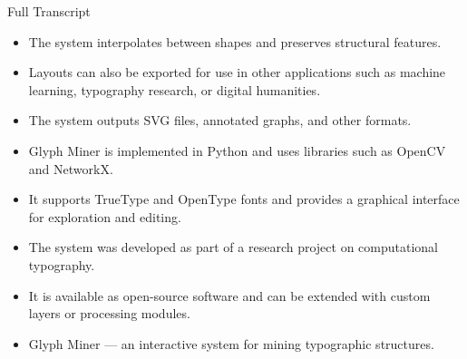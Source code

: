 \documentclass{beamer}
\begin{document}
\begin{frame}[allowframebreaks]{Full Transcript}
\begin{itemize}
\item The system interpolates between shapes and preserves structural features.
\item Layouts can also be exported for use in other applications such as machine learning, typography research, or digital humanities.
\item The system outputs SVG files, annotated graphs, and other formats.
\item Glyph Miner is implemented in Python and uses libraries such as OpenCV and NetworkX.
\item It supports TrueType and OpenType fonts and provides a graphical interface for exploration and editing.
\item The system was developed as part of a research project on computational typography.
\item It is available as open-source software and can be extended with custom layers or processing modules.
\item Glyph Miner — an interactive system for mining typographic structures.
\end{itemize}
\end{frame}
\end{document}
